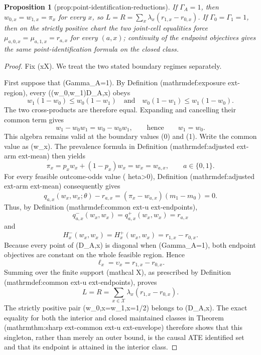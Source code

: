 \documentclass{article}
\newtheorem{proposition}{Proposition}
\begin{document}
\begin{proposition}[prop:point-identification-reductions]\label{prop:point-identification-reductions}
If \(\Gamma_A=1\), then \(w_{0,x}=w_{1,x}=\pi_x\) for every \(x\), so \(L=R=\sum_x\lambda_x(r_{1,x}-r_{0,x})\).  If \(\Gamma_0=\Gamma_1=1\), then on the strictly positive chart the two joint-cell equalities force \(\mu_{a,0,x}=\mu_{a,1,x}=r_{a,x}\) for every \((a,x)\); continuity of the endpoint objectives gives the same point-identification formula on the closed class.
\end{proposition}
\begin{proof}
Fix (x\in\mathcal X).  We treat the two stated boundary regimes separately.

First suppose that (Gamma\_A=1).  By Definition (mathrm{def{:}exposure  ext{-}region}), every ((w\_0,w\_1)\in D\_{A,x}) obeys
\[
w_1(1-w_0)\leq w_0(1-w_1)
\quad\text{and}\quad
w_0(1-w_1)\leq w_1(1-w_0).
\]
The two cross-products are therefore equal.  Expanding and cancelling their common term gives
\[
w_1-w_0w_1=w_0-w_0w_1,
\qquad\text{hence}\qquad
w_1=w_0.
\]
This algebra remains valid at the boundary values (0) and (1).  Write the common value as (w\_x).  The prevalence formula in Definition (mathrm{def{:}adjusted  ext{-}arm  ext{-}mean}) then yields
\[
\pi_x=p_xw_x+(1-p_x)w_x=w_x=w_{a,x},
\qquad a\in\{0,1\}.
\]
For every feasible outcome-odds value (  heta>0), Definition (mathrm{def{:}adjusted  ext{-}arm  ext{-}mean}) consequently gives
\[
q_{a,x}(w_x,w_x;\theta)-r_{a,x}
=(\pi_x-w_{a,x})(m_1-m_0)=0.
\]
Thus, by Definition (mathrm{def{:}common  ext{-}u  ext{-}endpoints}),
\[
q^-_{a,x}(w_x,w_x)=q^+_{a,x}(w_x,w_x)=r_{a,x}
\]
and
\[
H^-_x(w_x,w_x)=H^+_x(w_x,w_x)=r_{1,x}-r_{0,x}.
\]
Because every point of (D\_{A,x}) is diagonal when (Gamma\_A=1), both endpoint objectives are constant on the whole feasible region.  Hence
\[
\ell_x=\upsilon_x=r_{1,x}-r_{0,x}.
\]
Summing over the finite support (mathcal X), as prescribed by Definition (mathrm{def{:}common  ext{-}u  ext{-}endpoints}), proves
\[
L=R=\sum_{x\in\mathcal X}\lambda_x(r_{1,x}-r_{0,x}).
\]
The strictly positive pair (w\_{0,x}=w\_{1,x}=1/2) belongs to (D\_{A,x}).  The exact equality for both the interior and closed maintained classes in Theorem (mathrm{thm{:}sharp  ext{-}common  ext{-}u  ext{-}envelope}) therefore shows that this singleton, rather than merely an outer bound, is the causal ATE identified set and that its endpoint is attained in the interior class.


\end{proof}
\end{document}
